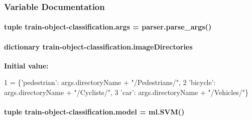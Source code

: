 \subsubsection{Variable Documentation}
\hypertarget{namespacetrain-object-classification_afa7a28d301302f6bd37de924c64b1bdc}{
\paragraph[{args}]{\setlength{\rightskip}{0pt plus 5cm}tuple train-\/object-\/classification.\-args = parser.\-parse\-\_\-args()}}\label{namespacetrain-object-classification_afa7a28d301302f6bd37de924c64b1bdc}
\hypertarget{namespacetrain-object-classification_ae0d18afa9685e4a46f18d0d05bdc2b2a}{
\paragraph[{image\-Directories}]{\setlength{\rightskip}{0pt plus 5cm}dictionary train-\/object-\/classification.\-image\-Directories}}\label{namespacetrain-object-classification_ae0d18afa9685e4a46f18d0d05bdc2b2a}
{\bfseries Initial value\-:}
\begin{DoxyCode}
1 = \{\textcolor{stringliteral}{'pedestrian'}: args.directoryName + \textcolor{stringliteral}{"/Pedestrians/"},
2                     \textcolor{stringliteral}{'bicycle'}: args.directoryName + \textcolor{stringliteral}{"/Cyclists/"},
3                     \textcolor{stringliteral}{'car'}: args.directoryName + \textcolor{stringliteral}{"/Vehicles/"}\}
\end{DoxyCode}
\hypertarget{namespacetrain-object-classification_a2460fc9486a03f588e9583a3d4969607}{
\paragraph[{model}]{\setlength{\rightskip}{0pt plus 5cm}tuple train-\/object-\/classification.\-model = {\bf ml.\-S\-V\-M}()}}\label{namespacetrain-object-classification_a2460fc9486a03f588e9583a3d4969607}
